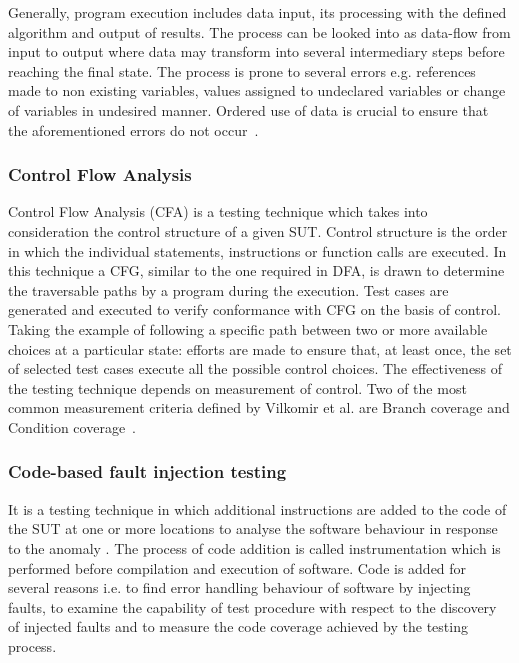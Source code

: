 Generally, program execution includes data input, its processing with the defined algorithm and output of results. The process can be looked into as data-flow from input to output where data may transform into several intermediary steps before reaching the final state. The process is prone to several errors e.g. references made to non existing variables, values assigned to undeclared variables or change of variables in undesired manner. Ordered use of data is crucial to ensure that the aforementioned errors do not occur~\cite{fosdick1976data}.

\subsubsection{Control Flow Analysis}
Control Flow Analysis (CFA) is a testing technique which takes into consideration the control structure of a given SUT. Control structure is the order in which the individual statements, instructions or function calls are executed. In this technique a CFG, similar to the one required in DFA, is drawn to determine the traversable paths by a program during the execution. Test cases are generated and executed to verify conformance with CFG on the basis of control. Taking the example of following a specific path between two or more available choices at a particular state: efforts are made to ensure that, at least once, the set of selected test cases execute all the possible control choices. The effectiveness of the testing technique depends on measurement of control. Two of the most common measurement criteria defined by Vilkomir et al. are Branch coverage and Condition coverage~\cite{vilkomir2003tolerance}. 

\subsubsection{Code-based fault injection testing}
It is a testing technique in which additional instructions are added to the code of the SUT at one or more locations to analyse the software behaviour in response to the anomaly \cite{voas1997software}. The process of code addition is called instrumentation which is performed before compilation and execution of software. Code is added for several reasons i.e. to find error handling behaviour of software by injecting faults, to examine the capability of test procedure with respect to the discovery of injected faults and to measure the code coverage achieved by the testing process.    

